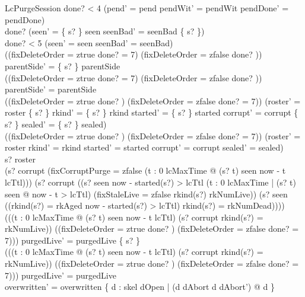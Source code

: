 \documentclass[a4paper,10pt,fleqn]{article}
\begin{document}
\begin{schema}{LcPurgeSession}
done? < 4 \implies (pend' = pend \land pendWit' = pendWit \land pendDone' = pendDone) \\
done?  \implies (seen' = \{ s? \} \ndres seen \land seenBad' = seenBad \setminus \{ s? \}) \\
done? < 5 \implies (seen' = seen \land seenBad' = seenBad) \\
((fixDeleteOrder = ztrue \land done? = 7) \lor (fixDeleteOrder = zfalse \land done? )) \implies parentSide' = \{ s? \} \ndres parentSide \\
\lnot ((fixDeleteOrder = ztrue \land done? = 7) \lor (fixDeleteOrder = zfalse \land done? )) \implies parentSide' = parentSide \\
((fixDeleteOrder = ztrue \land done? ) \lor (fixDeleteOrder = zfalse \land done? = 7)) \implies (roster' = roster \setminus \{ s? \} \land rkind' = \{ s? \} \ndres rkind \land started' = \{ s? \} \ndres started \land corrupt' = corrupt \setminus \{ s? \} \land sealed' = \{ s? \} \ndres sealed) \\
\lnot ((fixDeleteOrder = ztrue \land done? ) \lor (fixDeleteOrder = zfalse \land done? = 7)) \implies (roster' = roster \land rkind' = rkind \land started' = started \land corrupt' = corrupt \land sealed' = sealed) \\
s? \in roster \\
(s? \in corrupt \land (fixCorruptPurge = zfalse \lor \lnot (\exists t : 0 \upto lcMaxTime @ (s? \mapsto t) \in seen \land now - t \leq lcTtl))) \lor (s? \notin corrupt \land ((s? \in \dom seen \land now - started(s?) > lcTtl \land (\forall t : 0 \upto lcMaxTime | (s? \mapsto t) \in seen @ now - t > lcTtl) \land (fixStaleLive = zfalse \lor rkind(s?) \neq rkNumLive)) \lor (s? \notin \dom seen \land ((rkind(s?) = rkAged \land now - started(s?) > lcTtl) \lor rkind(s?) = rkNumDead)))) \\
(((\exists t : 0 \upto lcMaxTime @ (s? \mapsto t) \in seen \land now - t \leq lcTtl) \lor (s? \notin corrupt \land rkind(s?) = rkNumLive)) \land ((fixDeleteOrder = ztrue \land done? ) \lor (fixDeleteOrder = zfalse \land done? = 7))) \implies purgedLive' = purgedLive \cup \{ s? \} \\
\lnot (((\exists t : 0 \upto lcMaxTime @ (s? \mapsto t) \in seen \land now - t \leq lcTtl) \lor (s? \notin corrupt \land rkind(s?) = rkNumLive)) \land ((fixDeleteOrder = ztrue \land done? ) \lor (fixDeleteOrder = zfalse \land done? = 7))) \implies purgedLive' = purgedLive \\
overwritten' = overwritten \cup \{ d : skel \setminus dOpen | (d \in dAbort \iff d \notin dAbort') @ d \}
\end{schema}
\end{document}
